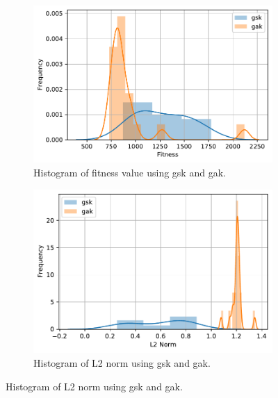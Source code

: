 \documentclass[./\jobname.tex]{subfiles}
\begin{document}
\begin{figure}[H]
	\centering
	\begin{subfigure}[b]{0.5\linewidth}
		\centering
		\includegraphics[width=1\textwidth]{../../code/experiments/experiment_3/pde5_non-adaptive_histogram_fit.pdf}
		\caption{Histogram of fitness value using \gls{gsk} and \gls{gak}.}
		\label{fig:pde5_fitness_histogram_gsk}
	\end{subfigure}%
	\begin{subfigure}[b]{0.48\linewidth}
		\centering
		\includegraphics[width=1\textwidth]{../../code/experiments/experiment_3/pde5_non-adaptive_histogram_L2.pdf}
		\caption{Histogram of L2 norm using \gls{gsk} and \gls{gak}.}
		\label{fig:pde5_L2norm_histogram_gsk}
	\end{subfigure}%
	\label{fig:pde5_ex3_histogram}
\end{figure}
\end{document}
